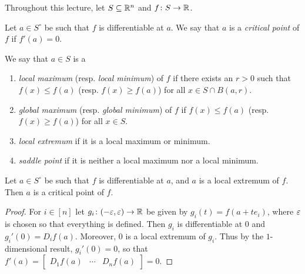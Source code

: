 
Throughout this lecture, let $S \subseteq \mathbb{R}^n$ and $f\colon S \to \mathbb{R}$.
\begin{definition} \label{def:crit}
    Let $a \in S^\circ$ be such that $f$ is differentiable at $a$.
    We say that $a$ is a \emph{critical point} of $f$ if $f'(a) = 0$.
\end{definition}

\begin{definition}[extrema] \label{def:extrema}
    We say that $a \in S$ is a
    \begin{enumerate}
        \item \emph{local maximum} (resp. \emph{local minimum}) of $f$
            if there exists an $r > 0$ such that $f(x) \le f(a)$
            (resp. $f(x) \ge f(a)$) for all $x \in S \cap B(a, r)$.
        \item \emph{global maximum} (resp. \emph{global minimum}) of $f$
            if $f(x) \le f(a)$ (resp. $f(x) \ge f(a)$) for all $x \in S$.
        \item \emph{local extremum} if it is a local maximum or minimum.
        \item \emph{saddle point} if it is neither a local maximum nor
            a local minimum.
    \end{enumerate}
\end{definition}

\begin{proposition}
    Let $a \in S^\circ$ be such that $f$ is differentiable at $a$, and
    $a$ is a local extremum of $f$.
    Then $a$ is a critical point of $f$.
\end{proposition}
\begin{proof}
    For $i \in [n]$ let $g_i\colon (-\varepsilon, \varepsilon) \to \mathbb{R}$ be given by
    $g_i(t) = f(a + t e_i)$, where $\varepsilon$ is chosen so that everything is
    defined.
    Then $g_i$ is differentiable at $0$ and $g_i'(0) = D_i f(a)$.
    Moreover, $0$ is a local extremum of $g_i$.
    Thus by the $1$-dimensional result, $g_i'(0) = 0$, so that
    $f'(a) = \begin{bmatrix} D_1 f(a) & \cdots & D_n f(a) \end{bmatrix}
    = 0$.
\end{proof}

